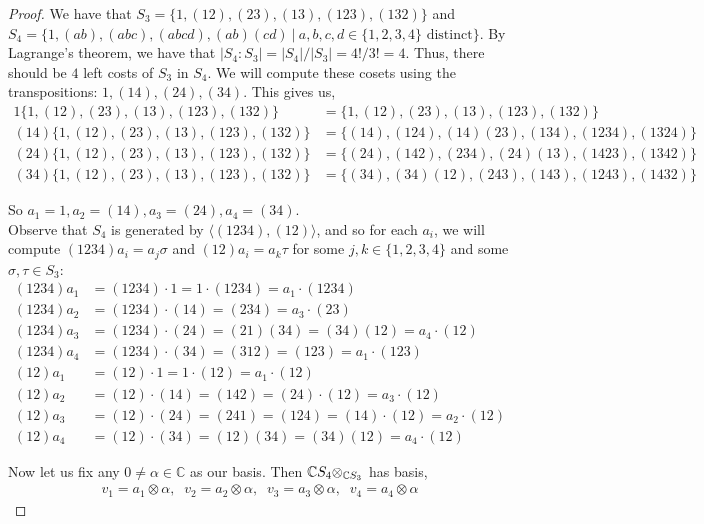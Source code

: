 \documentclass[11pt, reqno]{amsart}
\theoremstyle{plain}
\theoremstyle{definition}
\theoremstyle{example}
\begin{document}
\begin{proof}
We have that $S_3 = \{1, (12), (23), (13), (123), (132)\}$ and $S_4 = \{1, (ab), (abc), (abcd), (ab)(cd) \ | \ a,b,c,d \in \{1,2,3,4\} \text{ distinct}\}$. By Lagrange's theorem, we have that $|S_4 : S_3| = |S_4|/|S_3| = 4!/3! = 4$. Thus, there should be $4$ left costs of $S_3$ in $S_4$. We will compute these cosets using the transpositions: $1, (14), (24), (34)$. This gives us,
\begin{align*}
1\{1, (12), (23), (13), (123), (132)\} &= \{1, (12), (23), (13), (123), (132)\}\\
(14)\{1, (12), (23), (13), (123), (132)\} &= \{(14), (124), (14)(23), (134), (1234), (1324)\}\\
(24)\{1, (12), (23), (13), (123), (132)\} &= \{(24), (142), (234), (24)(13), (1423), (1342)\}\\
(34)\{1, (12), (23), (13), (123), (132)\} &= \{(34), (34)(12), (243), (143), (1243), (1432)\}
\end{align*}

So $a_1 = 1, a_2 = (14), a_3 = (24), a_4 = (34)$.\\

Observe that $S_4$ is generated by $\langle (1234), (12) \rangle$, and so for each $a_i$, we will compute $(1234)a_i = a_j \sigma$ and $(12)a_i = a_k \tau$ for some $j,k \in \{1,2,3,4\}$ and some $\sigma, \tau \in S_3$:
\begin{align*}
(1234)a_1 &= (1234) \cdot 1 = 1 \cdot (1234) = a_1 \cdot (1234)\\
(1234)a_2 &= (1234) \cdot (14) = (234) = a_3 \cdot (23)\\
(1234)a_3 &= (1234) \cdot (24) = (21)(34) = (34)(12) = a_4 \cdot (12)\\
(1234)a_4 &= (1234) \cdot (34) = (312) = (123) = a_1 \cdot (123)\\
(12)a_1 &= (12) \cdot 1 = 1 \cdot (12) = a_1 \cdot (12)\\
(12)a_2 &= (12) \cdot (14) = (142) = (24) \cdot (12) = a_3 \cdot (12)\\
(12)a_3 &= (12) \cdot (24) = (241) = (124) = (14) \cdot (12) = a_2 \cdot (12)\\
(12)a_4 &= (12) \cdot (34) = (12)(34) = (34)(12) = a_4 \cdot (12)
\end{align*}

Now let us fix any $0 \neq \alpha \in \mathbb{C}$ as our basis. Then $\mathbb{C} S_4 \otimes_{\mathbb{C} S_3}$ has basis,
\begin{align*}
v_1 = a_1 \otimes \alpha, \; \; v_2 = a_2 \otimes \alpha, \; \; v_3 = a_3 \otimes \alpha, \; \; v_4 = a_4 \otimes \alpha
\end{align*}


\end{proof}
\end{document}
